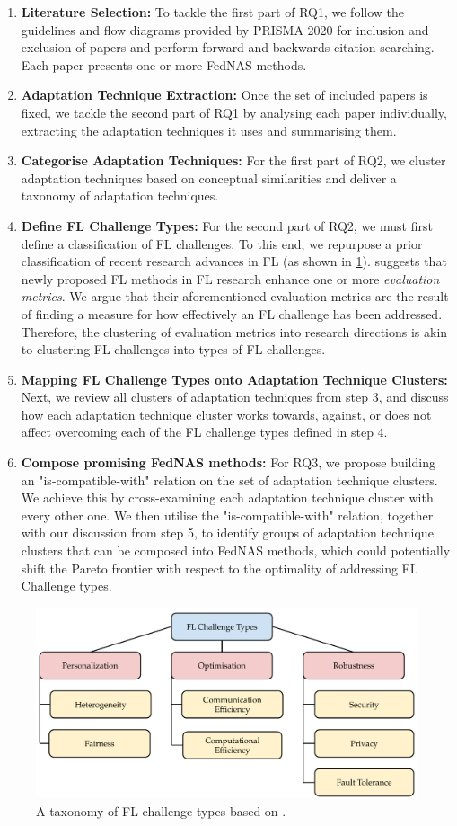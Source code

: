\begin{enumerate}
    \item \textbf{Literature Selection:} To tackle the first part of RQ1, we follow the guidelines and flow diagrams provided by PRISMA 2020 \cite{prisma_2020} for inclusion and exclusion of papers and perform forward and backwards citation searching. Each paper presents one or more FedNAS methods. 
    \item \textbf{Adaptation Technique Extraction:} Once the set of included papers is fixed, we tackle the second part of RQ1 by analysing each paper individually, extracting the adaptation techniques it uses and summarising them.
    \item \textbf{Categorise Adaptation Techniques:} For the first part of RQ2, we cluster adaptation techniques based on conceptual similarities and deliver a taxonomy of adaptation techniques.
    \item \textbf{Define FL Challenge Types:} For the second part of RQ2, we must first define a classification of FL challenges. To this end, we repurpose a prior classification \cite{fl_taxonomy_2024} of recent research advances in FL (as shown in \ref{fig:fl_challenge_types_taxonomy}). \cite{fl_taxonomy_2024} suggests that newly proposed FL methods in FL research enhance one or more \textit{evaluation metrics}. We argue that their aforementioned evaluation metrics are the result of finding a measure for how effectively an FL challenge has been addressed. Therefore, the clustering of evaluation metrics into research directions is akin to clustering FL challenges into types of FL challenges.
    \item \textbf{Mapping FL Challenge Types onto Adaptation Technique Clusters:} Next, we review all clusters of adaptation techniques from step 3, and discuss how each adaptation technique cluster works towards, against, or does not affect overcoming each of the FL challenge types defined in step 4.
    \item \textbf{Compose promising FedNAS methods:} For RQ3, we propose building an "is-compatible-with" relation on the set of adaptation technique clusters. We achieve this by cross-examining each adaptation technique cluster with every other one. We then utilise the "is-compatible-with" relation, together with our discussion from step 5, to identify groups of adaptation technique clusters that can be composed into FedNAS methods, which could potentially shift the Pareto frontier with respect to the optimality of addressing FL Challenge types.
\end{enumerate}

\begin{figure}[hbtp]
  \centering
  \includegraphics[width=\textwidth]{figures/fl_challenge_types_taxonomy.pdf}
  \caption{A taxonomy of FL challenge types based on \cite{fl_taxonomy_2024}.}
  \label{fig:fl_challenge_types_taxonomy}
\end{figure}